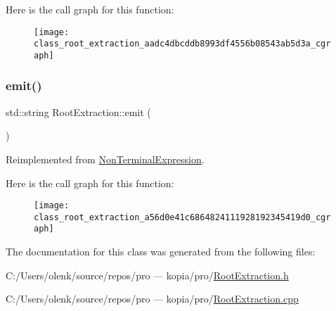 Here is the call graph for this function\+:
\nopagebreak
\begin{figure}[H]
\begin{center}
\leavevmode
\texttt{[image: class\_root\_extraction\_aadc4dbcddb8993df4556b08543ab5d3a\_cgraph]}
\end{center}
\end{figure}
\mbox{\label{class_root_extraction_a56d0e41c6864824111928192345419d0}} 
\subsubsection{\texorpdfstring{emit()}{emit()}}
{\footnotesize\ttfamily std\+::string Root\+Extraction\+::emit (\begin{DoxyParamCaption}{ }\end{DoxyParamCaption})\hspace{0.3cm}{\ttfamily [virtual]}}



Reimplemented from \mbox{\hyperlink{class_non_terminal_expression_affcc5d6e649552b3788661ec9663eb63}{Non\+Terminal\+Expression}}.

Here is the call graph for this function\+:
\nopagebreak
\begin{figure}[H]
\begin{center}
\leavevmode
\texttt{[image: class\_root\_extraction\_a56d0e41c6864824111928192345419d0\_cgraph]}
\end{center}
\end{figure}


The documentation for this class was generated from the following files\+:\begin{DoxyCompactItemize}
\item 
C\+:/\+Users/olenk/source/repos/pro — kopia/pro/\mbox{\hyperlink{_root_extraction_8h}{Root\+Extraction.\+h}}\item 
C\+:/\+Users/olenk/source/repos/pro — kopia/pro/\mbox{\hyperlink{_root_extraction_8cpp}{Root\+Extraction.\+cpp}}\end{DoxyCompactItemize}
